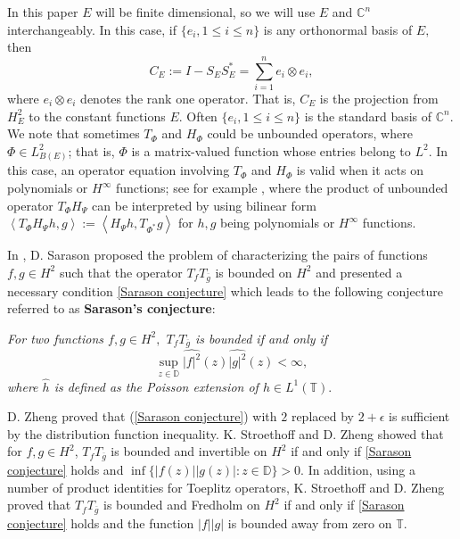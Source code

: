 \documentclass{article}%
\begin{document}
In this paper $E$ will be finite dimensional, so we will use $E$ and
$\mathbb{C}^{n}$ interchangeably. In this case, if $\{e_{i},1\leq i\leq n\}$
is any orthonormal basis of $E,$ then%
\begin{equation}
C_{E}:=I-S_{E}S_{E}^{\ast}=\sum_{i=1}^{n}e_{i}\otimes e_{i}, \label{defce}%
\end{equation}
where $e_{i}\otimes e_{i}$ denotes the rank one operator. That is, $C_{E}$ is
the projection from $H_{E}^{2}$ to the constant functions $E.$ Often
$\{e_{i},1\leq i\leq n\}$ is the standard basis of $\mathbb{C}^{n}.$ We note
that sometimes $T_{\Phi}$ and $H_{\Phi}$ could be unbounded operators, where
$\Phi\in L_{B(E)}^{2}$; that is, $\Phi$ is a matrix-valued function whose
entries belong to $L^{2}.$ In this case, an operator equation involving
$T_{\Phi}$ and $H_{\Phi}$ is valid when it acts on polynomials or $H^{\infty}$
functions; see for example \cite{GuH}, where the product of unbounded operator
$T_{\Phi}H_{\Psi}$ can be interpreted by using bilinear form $\left\langle
T_{\Phi}H_{\Psi}h,g\right\rangle :=\left\langle H_{\Psi}h,T_{\Phi^{\ast}%
}g\right\rangle $ for $h,g$ being polynomials or $H^{\infty}$ functions.

In \cite{Sarason problem}, D. Sarason proposed the problem of characterizing the pairs of functions $f,g\in H^2$ such that the operator $T_{f}T_{\overline{g}}$ is bounded on $H^2$ and presented a necessary condition \eqref{Sarason conjecture} which leads to the following conjecture referred to as \textbf{Sarason's conjecture}:

{\sl For two functions $f,g\in H^2,$ $T_{f}T_{\overline{g}}$ is bounded if and only if 
\begin{equation}\label{Sarason conjecture}
\sup_{z\in \mathbb D}\widehat{|f|^2}(z)\widehat{|g|^2}(z)<\infty,
\end{equation}
where $\widehat{h}$ is defined as the Poisson extension of $h\in L^1(\mathbb T).$}

D. Zheng \cite{Zheng} proved that (\ref{Sarason conjecture}) with $2$ replaced by $2+\epsilon$ is sufficient by the distribution function inequality. K. Stroethoff and D. Zheng \cite{strzheng2} showed that for $ f, g \in H^2 $, $ T_f T_{\overline{g}} $ is bounded and invertible on $ H^2 $ if and only if \eqref{Sarason conjecture} holds and $ \inf\{ |f(z)||g(z)| : z \in \mathbb{D} \} > 0 $.
In addition, using a number of product identities for Toeplitz operators, K. Stroethoff and D. Zheng \cite{strzheng2} proved that $ T_f T_{\overline{g}} $ is bounded and Fredholm on $ H^2 $ if and only if \eqref{Sarason conjecture}
holds and the function $|f||g|$  is
 bounded away from zero on $\mathbb{T}$.
\end{document}
